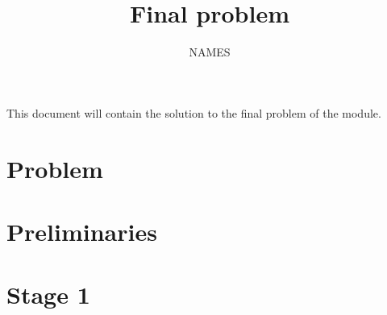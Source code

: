 \documentclass[11pt,reqno,oneside,a4paper]{article}
\title{Final problem}
\author{NAMES}
\begin{document}

\maketitle
\thispagestyle{fancy}

This document will contain the solution to the final problem of the module.

\tableofcontents

\clearpage
\section{Problem} \label{sec:Problem}


\clearpage
\section{Preliminaries} \label{sec:Preliminaries}


\clearpage
\section{Stage 1} \label{sec:Stage1}


% 
\end{document}
